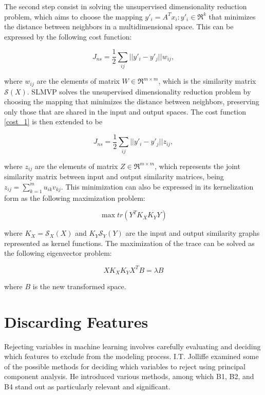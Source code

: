 The second step consist in solving the unsupervised dimensionality reduction problem, which aims to choose the mapping $y'_i = A^T x_i : y'_i \in \mathfrak{R}^k$ that minimizes the distance between neighbors in a multidimensional space. This can be expressed by the following cost function:

\begin{equation}\label{cost_1}
  J_{ns} = \frac{1}{2} \sum_{ij} || y'_i - y'_j || w_{ij},
\end{equation}

where $w_{ij}$ are the elements of matrix $W \in \mathfrak{R}^{m \times m}$, which is the similarity matrix $\mathscr{S}(X)$.
SLMVP solves the unsupervised dimensionality reduction problem  by choosing the mapping that  minimizes the distance between neighbors, preserving only those that are shared in the input and output spaces. The cost function \ref{cost_1} is then extended to be

\begin{equation}
  J_{ns} = \frac{1}{2} \sum_{ij} || y'_i - y'_j || z_{ij},
\end{equation}

where $z_{ij}$ are the elements of matrix $Z \in \mathfrak{R}^{m \times m}$, which represents the joint similarity matrix between input and output similarity matrices, being $z_{ij} = \sum^m_{k=1} u_{ik}v_{kj}$. This minimization can also be expressed in its kernelization form as the following maximization problem:

\begin{equation}
  \max tr(Y^T K_X K_Y Y)
\end{equation}

where $K_X = \mathscr{S}_X(X)$ and $K_Y \mathscr{S}_Y(Y)$ are the input and output similarity graphs represented as kernel functions. The maximization of the trace can be solved as the following eigenvector problem:

\begin{equation}
  X K_X K_Y X^T B = \lambda B
\end{equation}

where $B$ is the new transformed space.

\section{Discarding Features}

Rejecting variables in machine learning involves carefully evaluating and deciding which features to exclude from the modeling process. I.T. Jolliffe \cite{b2b4} examined some of the possible methods for deciding which variables to reject using principal component analysis. He introduced various methods, among which B1, B2, and B4 stand out as particularly relevant and significant.

